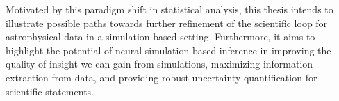Motivated by this paradigm shift in statistical analysis, this thesis intends to illustrate possible paths towards further refinement of the scientific loop for astrophysical data in a simulation-based setting. Furthermore, it aims to highlight the potential of neural simulation-based inference in improving the quality of insight we can gain from simulations, maximizing information extraction from data, and providing robust uncertainty quantification for scientific statements.


%
%


